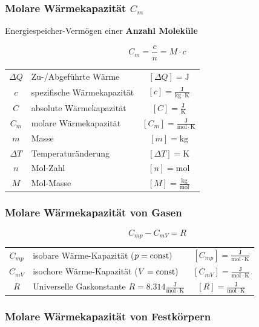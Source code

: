 \subsubsection{Molare Wärmekapazität $C_m$}
Energiespeicher-Vermögen einer \textbf{Anzahl Moleküle}

$$ \boxed{ C_m = \frac{c}{n} = M \cdot c } $$


\begin{tabular}{c l c}
	$\Delta Q$ & Zu-/Abgeführte Wärme & $[\Delta Q] = \mathrm{J}$ \\
	\rule{0pt}{8pt}$c$ & spezifische Wärmekapazität & $[c] = \mathrm{\frac{J}{kg \cdot K}}$ \\
	\rule{0pt}{8pt}$C$ & absolute Wärmekapazität & $[C] = \mathrm{\frac{J}{K}}$ \\
	\rule{0pt}{8pt}$C_m$ & molare Wärmekapazität & $[C_m] = \mathrm{\frac{J}{mol \cdot K}}$ \\
	$m$ & Masse & $[m] = \mathrm{kg}$ \\
	$\Delta T$ & Temperaturänderung & $[\Delta T] = \mathrm{K}$ \\
	$n$ & Mol-Zahl & $[n] = \mathrm{mol}$ \\
	\rule{0pt}{8pt}$M$ & Mol-Masse & $[M] = \mathrm{\frac{kg}{mol}}$ \\
\end{tabular}




\vfill\null
\columnbreak




\subsubsection{Molare Wärmekapazität von Gasen}

$$ \boxed{ C_{mp} - C_{mV} = R }$$


\begin{tabular}{c l c}
	\rule{0pt}{8pt}$C_{mp}$ & isobare Wärme-Kapazität ($p = \mathrm{const})$ & $[C_{mp}] = \mathrm{\frac{J}{mol \cdot K}}$ \\
	\rule{0pt}{8pt}$C_{mV}$ & isochore Wärme-Kapazität ($V = \mathrm{const})$ & $[C_{mV}] = \mathrm{\frac{J}{mol \cdot K}}$ \\
	\rule{0pt}{8pt}$R$ & Universelle Gaskonstante $R = 8.314 \mathrm{\frac{J}{mol \cdot K}}$ & $[R] = \mathrm{\frac{J}{mol \cdot K}} $ \\
\end{tabular}




\subsubsection{Molare Wärmekapazität von Festkörpern}


